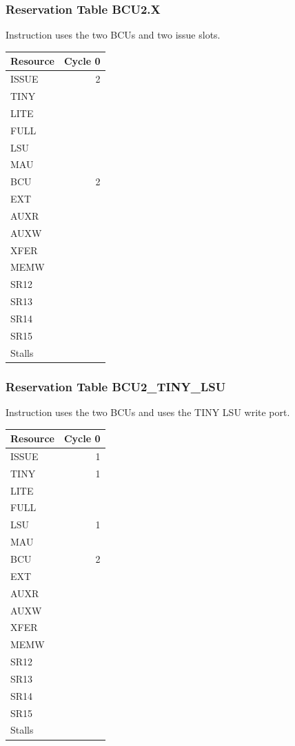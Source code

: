 \subsubsection{Reservation Table BCU2.X} \label{sec:reservation-BCU2.X}

Instruction uses the two BCUs and two issue slots.
\medskip

\begin{tabular}{|l|r|} \hline
Resource	& Cycle 0 \\ \hline
\textsf{ISSUE}	& 2	\\
\textsf{TINY}	& 	\\
\textsf{LITE}	& 	\\
\textsf{FULL}	& 	\\
\textsf{LSU}	& 	\\
\textsf{MAU}	& 	\\
\textsf{BCU}	& 2	\\
\textsf{EXT}	& 	\\
\textsf{AUXR}	& 	\\
\textsf{AUXW}	& 	\\
\textsf{XFER}	& 	\\
\textsf{MEMW}	& 	\\
\textsf{SR12}	& 	\\
\textsf{SR13}	& 	\\
\textsf{SR14}	& 	\\
\textsf{SR15}	& 	\\
\hline Stalls	& 	\\
\hline \end{tabular}

\subsubsection{Reservation Table BCU2\_TINY\_LSU} \label{sec:reservation-BCU2-TINY-LSU}

Instruction uses the two BCUs and uses the TINY LSU write port.
\medskip

\begin{tabular}{|l|r|} \hline
Resource	& Cycle 0 \\ \hline
\textsf{ISSUE}	& 1	\\
\textsf{TINY}	& 1	\\
\textsf{LITE}	& 	\\
\textsf{FULL}	& 	\\
\textsf{LSU}	& 1	\\
\textsf{MAU}	& 	\\
\textsf{BCU}	& 2	\\
\textsf{EXT}	& 	\\
\textsf{AUXR}	& 	\\
\textsf{AUXW}	& 	\\
\textsf{XFER}	& 	\\
\textsf{MEMW}	& 	\\
\textsf{SR12}	& 	\\
\textsf{SR13}	& 	\\
\textsf{SR14}	& 	\\
\textsf{SR15}	& 	\\
\hline Stalls	& 	\\
\hline \end{tabular}

